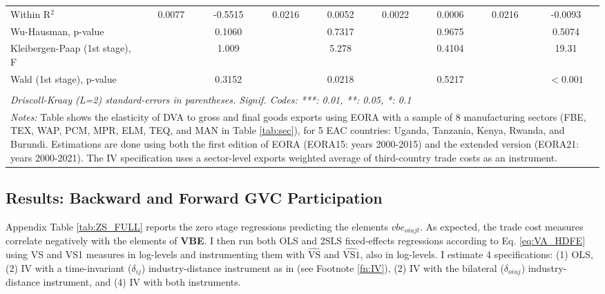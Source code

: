 \documentclass[a4paper]{article}
\begin{document}
\begin{table}[h!]
{\begin{tabular}{lcccccccc}
      Within R$^2$                        & 0.0077         & -0.5515     & 0.0216         & 0.0052      & 0.0022       & 0.0006      & 0.0216         & -0.0093\\  
      Wu-Hausman, p-value                 &                & 0.1060      &                & 0.7317      &              & 0.9675      &                & 0.5074\\  
      Kleibergen-Paap (1st stage), F &           & 1.009       &                & 5.278       &              & 0.4104      &                & 19.31\\ 
      Wald (1st stage), p-value   &                & 0.3152      &                & 0.0218             &                & 0.5217      &                & $<0.001$ \\  
      \bottomrule \\ [-0.9em]
      \multicolumn{9}{l}{\emph{Driscoll-Kraay (L=2) standard-errors in parentheses. Signif. Codes: ***: 0.01, **: 0.05, *: 0.1}}\\
       \multicolumn{9}{l}{\parbox{1.25\textwidth}{\scriptsize
\textit{Notes:} Table shows the elasticity of DVA to gross and final goods exports using EORA with a sample of 8 manufacturing sectors (FBE, TEX, WAP, PCM, MPR, ELM, TEQ, and MAN in Table \ref{tab:sec}), for 5 EAC countries: Uganda, Tanzania, Kenya, Rwanda, and Burundi. Estimations are done using both the first edition of EORA (EORA15: years 2000-2015) and the extended version (EORA21: years 2000-2021). The IV specification uses a sector-level exports weighted average of third-country trade costs as an instrument.  }}
   \end{tabular}
   }
\end{table}



\subsection{Results: Backward and Forward GVC Participation}

Appendix Table \ref{tab:ZS_FULL} reports the zero stage regressions predicting the elements $vbe_{oiujt}$. As expected, the trade cost measures correlate negatively with the elements of \textbf{VBE}. I then run both OLS and 2SLS fixed-effects regressions according to Eq. \ref{eq:VA_HDFE} using VS and VS1 measures in log-levels and instrumenting them with $\hat{\text{VS}}$ and $\hat{\text{VS1}}$, also in log-levels. I estimate 4 specifications: (1) OLS, (2) IV with a time-invariant ($\delta_{ij}$) industry-distance instrument as in \citet{Kummritz20161} (see Footnote \ref{fn:IV}), (2) IV with the bilateral ($\delta_{oiuj}$) industry-distance instrument, and (4) IV with both instruments. \newline
\end{document}
